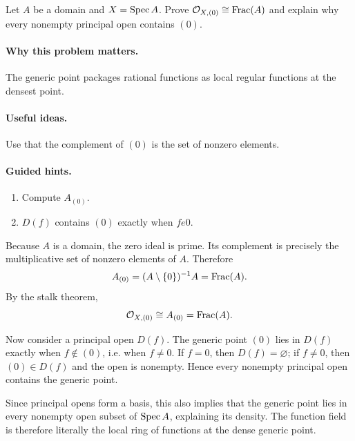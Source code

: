 \begin{problem}\label{prob:vi17-p11}
Let $A$ be a domain and $X=\operatorname{Spec} A$.  Prove $\mathcal O_{X,(0)}\cong\operatorname{Frac}(A)$ and explain why every nonempty principal open contains $(0)$.
\end{problem}

\ifdefined\FullProblemDossiers
\paragraph{Why this problem matters.}
The generic point packages rational functions as local regular functions at the densest point.

\paragraph{Useful ideas.}
Use that the complement of $(0)$ is the set of nonzero elements.

\paragraph{Guided hints.}
\begin{enumerate}
\item Compute $A_{(0)}$.
\item $D(f)$ contains $(0)$ exactly when $f
e0$.
\end{enumerate}

\begin{solution}
Because $A$ is a domain, the zero ideal is prime.  Its complement is precisely the multiplicative set of nonzero elements of $A$.  Therefore
\[
A_{(0)}=(A\setminus\{0\})^{-1}A=\operatorname{Frac}(A).
\]
By the stalk theorem,
\[
\mathcal O_{X,(0)}\cong A_{(0)}=\operatorname{Frac}(A).
\]

Now consider a principal open $D(f)$.  The generic point $(0)$ lies in $D(f)$ exactly when $f\notin(0)$, i.e. when $f\neq0$.  If $f=0$, then $D(f)=\varnothing$; if $f\neq0$, then $(0)\in D(f)$ and the open is nonempty.  Hence every nonempty principal open contains the generic point.

Since principal opens form a basis, this also implies that the generic point lies in every nonempty open subset of $\operatorname{Spec} A$, explaining its density.  The function field is therefore literally the local ring of functions at the dense generic point.
\end{solution}



